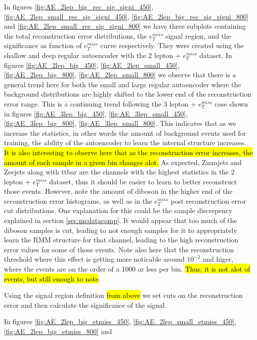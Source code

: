 In figures \ref{fig:AE_2lep_big_rec_sig_signi_450}, \ref{fig:AE_2lep_small_rec_sig_signi_450}, 
\ref{fig:AE_2lep_big_rec_sig_signi_800} and \ref{fig:AE_2lep_small_rec_sig_signi_800} we have three 
subplots containing the total reconstruction error distributions, the $e_T^{miss}$ signal region, 
and the significance as function of $e_T^{miss}$ curve respectively. They were created using 
the shallow and deep regular autoencoder with the 2 lepton + $e_T^{miss}$ dataset.
In figures \ref{fig:AE_2lep_big_450}, \ref{fig:AE_2lep_small_450}, \ref{fig:AE_2lep_big_800}, 
\ref{fig:AE_2lep_small_800} we observe that there is a general trend here for both the small 
and large regular autoencoder where the background distributions are highly shifted to the 
lower end of the reconstruction error range. This is a continuing trend following the 3 
lepton + $e_T^{miss}$ case shown in figures \ref{fig:AE_3lep_big_450}, \ref{fig:AE_3lep_small_450},
\ref{fig:AE_3lep_big_800}, \ref{fig:AE_3lep_small_800}. 
This indicates that as we increase the statistics, in other words the amount of background events 
used for training, the ability of the autoencoder to learn the internal structure increases. 
\hl{It is also interesting to observe here that as the reconstruction error increases, the amount 
of each sample in a given bin changes alot.} As expected, Zmmjets and Zeejets along with ttbar 
are the channels with the highest statistics in the 2 lepton + $e_T^{miss}$ dataset, thus it 
should be easier to learn to better reconstruct those events. However, note the amount of 
diboson in the higher end of the reconstruction error histograms, as well as in the $e_T^{miss}$ 
post reconstruction error cut distributions. One explanation for this could be the sample 
discrepency explained in section \ref{sec:mcdatacomp}. It would appear that too much of the 
diboson samples is cut, leading to not enough samples for it to appropriately learn the RMM 
structure for that channel, leading to the high reconstruction error values for some of 
those events. Note also here that the reconstruction threshold where this effect is getting 
more noticable around $10^{-2}$ and higer, where the events are on the order of a 1000 or 
less per bin. \hl{Thus, it is not alot of events, but still enough to note}. \par Using the signal 
region definition \hl{from above} we set cuts on the reconstruction error and then calculate the 
significance of the signal. \par
In figures \ref{fig:AE_2lep_big_etmiss_450}, \ref{fig:AE_2lep_small_etmiss_450}, \ref{fig:AE_2lep_big_etmiss_800} and  
